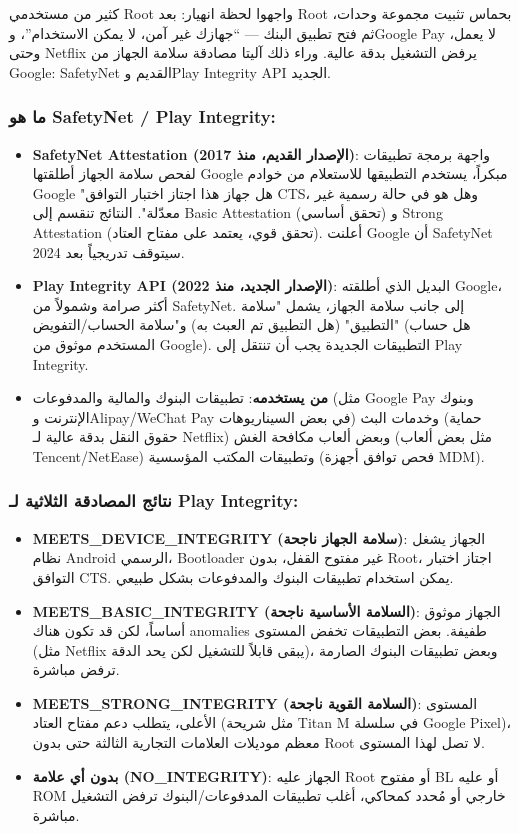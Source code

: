 
كثير من مستخدمي Root واجهوا لحظة انهيار: بعد Root بحماس تثبيت مجموعة وحدات، ثم فتح تطبيق البنك — “جهازك غير آمن، لا يمكن الاستخدام”، وGoogle Pay لا يعمل، وحتى Netflix يرفض التشغيل بدقة عالية. وراء ذلك آليتا مصادقة سلامة الجهاز من Google: SafetyNet القديم وPlay Integrity API الجديد.

\subsubsection*{ما هو SafetyNet / Play Integrity:}

\begin{itemize}
  \item \textbf{SafetyNet Attestation (الإصدار القديم، منذ 2017)}: واجهة برمجة تطبيقات لفحص سلامة الجهاز أطلقتها Google مبكراً، يستخدم التطبيقها للاستعلام من خوادم Google "هل جهاز هذا اجتاز اختبار التوافق CTS، وهل هو في حالة رسمية غير معدّلة". النتائج تنقسم إلى Basic Attestation (تحقق أساسي) و Strong Attestation (تحقق قوي، يعتمد على مفتاح العتاد). أعلنت Google أن SafetyNet سيتوقف تدريجياً بعد 2024.
  \item \textbf{Play Integrity API (الإصدار الجديد، منذ 2022)}: البديل الذي أطلقته Google، أكثر صرامة وشمولاً من SafetyNet. إلى جانب سلامة الجهاز، يشمل "سلامة التطبيق" (هل التطبيق تم العبث به) و"سلامة الحساب/التفويض" (هل حساب المستخدم موثوق من Google). التطبيقات الجديدة يجب أن تنتقل إلى Play Integrity.
  \item \textbf{من يستخدمه}: تطبيقات البنوك والمالية والمدفوعات (مثل Google Pay وبنوك الإنترنت وAlipay/WeChat Pay في بعض السيناريوهات) وخدمات البث (حماية حقوق النقل بدقة عالية لـ Netflix) وبعض ألعاب مكافحة الغش (مثل بعض ألعاب Tencent/NetEase) وتطبيقات المكتب المؤسسية (فحص توافق أجهزة MDM).
\end{itemize}

\subsubsection*{نتائج المصادقة الثلاثية لـ Play Integrity:}

\begin{itemize}
  \item \textbf{MEETS\_DEVICE\_INTEGRITY (سلامة الجهاز ناجحة)}: الجهاز يشغل نظام Android الرسمي، Bootloader غير مفتوح القفل، بدون Root، اجتاز اختبار التوافق CTS. يمكن استخدام تطبيقات البنوك والمدفوعات بشكل طبيعي.
  \item \textbf{MEETS\_BASIC\_INTEGRITY (السلامة الأساسية ناجحة)}: الجهاز موثوق أساساً، لكن قد تكون هناك anomalies طفيفة. بعض التطبيقات تخفض المستوى (مثل Netflix يبقى قابلاً للتشغيل لكن يحد الدقة)، وبعض تطبيقات البنوك الصارمة ترفض مباشرة.
  \item \textbf{MEETS\_STRONG\_INTEGRITY (السلامة القوية ناجحة)}: المستوى الأعلى، يتطلب دعم مفتاح العتاد (مثل شريحة Titan M في سلسلة Google Pixel)، معظم موديلات العلامات التجارية الثالثة حتى بدون Root لا تصل لهذا المستوى.
  \item \textbf{بدون أي علامة (NO\_INTEGRITY)}: الجهاز عليه Root أو مفتوح BL أو عليه ROM خارجي أو مُحدد كمحاكي، أغلب تطبيقات المدفوعات/البنوك ترفض التشغيل مباشرة.
\end{itemize}

